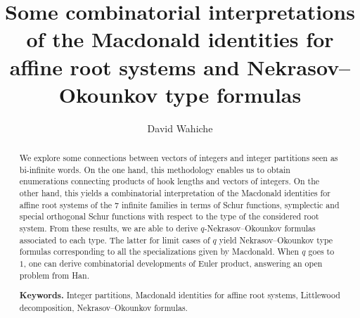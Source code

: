 \documentclass[11pt,letterpaper]{amsart}
\numberwithin{equation}{section}
\numberwithin{df}{section}
\begin{document}
\title[From Macdonald identities to Nekrasov--Okounkov type formulas]{Some combinatorial interpretations of the Macdonald identities for affine root systems and Nekrasov--Okounkov type formulas}



\author{David Wahiche}\address{Univ. de Tours, UMR CNRS 7013, Institut Denis Poisson, France}







\maketitle


\begin{abstract}
We explore some connections between vectors of integers and integer partitions seen as bi-infinite words. On the one hand, this methodology enables us to obtain enumerations connecting products of hook lengths and vectors of integers.
On the other hand, this yields a combinatorial interpretation of the Macdonald identities for affine root systems of the $7$ infinite families in terms of Schur functions, symplectic and special orthogonal Schur functions with respect to the type of the considered root system. From these results, we are able to derive $q$-Nekrasov--Okounkov formulas associated to each type. The latter for limit cases of $q$ yield Nekrasov--Okounkov type formulas corresponding to all the specializations given by Macdonald. When $q$ goes to $1$, one can derive combinatorial developments of Euler product, answering an open problem from Han.

\smallskip
\noindent\textbf{Keywords.} Integer partitions, Macdonald identities for affine root systems, Littlewood decomposition, Nekrasov--Okounkov formulas.
\end{abstract}
\end{document}
